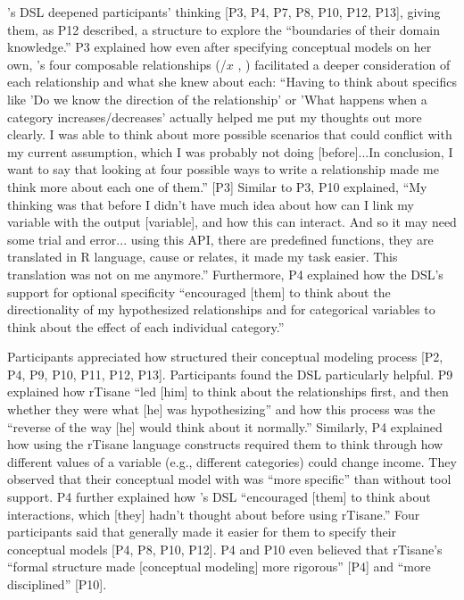\rTisane’s DSL deepened participants’ thinking [P3, P4, P7, P8, P10, P12, P13],
giving them, as P12 described, a structure to explore the ``boundaries of their
domain knowledge.'' P3 explained how even after specifying conceptual models on
her own, \rTisane’s four composable relationships (\assume/\hypothesize $x$
\causes, \relates) facilitated a deeper consideration of each relationship and
what she knew about each: ``Having to think about specifics like 'Do we know the
direction of the relationship' or 'What happens when a category
increases/decreases' actually helped me put my thoughts out more clearly. I was
able to think about more possible scenarios that could conflict with my current
assumption, which I was probably not doing [before]...In conclusion, I want to
say that looking at four possible ways to write a relationship made me think
more about each one of them.'' [P3] Similar to P3, P10 explained, ``My thinking
was that before I didn’t have much idea about how can I link my variable with
the output [variable], and how this can interact. And so it may need some trial
and error... using this API, there are predefined functions, they are translated
in R language, cause or relates, it made my task easier. This translation was
not on me anymore.'' Furthermore, P4 explained how the DSL’s support for
optional specificity ``encouraged [them] to think about the directionality of my
hypothesized relationships and for categorical variables to think about the
effect of each individual category.'' 

Participants appreciated how \rTisane structured their conceptual modeling
process [P2, P4, P9, P10, P11, P12, P13]. Participants found the \rTisane DSL
particularly helpful. P9 explained how rTisane ``led [him] to think about the
relationships first, and then whether they were what [he] was hypothesizing''
and how this process was the ``reverse of the way [he] would think about it
normally.'' Similarly, P4 explained how using the rTisane language constructs
required them to think through how different values of a variable (e.g.,
different categories) could change income. They observed that their conceptual
model with \rTisane was ``more specific'' than without tool support. P4 further
explained how \rTisane’s DSL ``encouraged [them] to think about interactions,
which [they] hadn't thought about before using rTisane.'' Four participants said
that \rTisane generally made it easier for them to specify their conceptual
models [P4, P8, P10, P12]. P4 and P10 even believed that rTisane’s ``formal
structure made [conceptual modeling] more rigorous'' [P4] and ``more
disciplined'' [P10].

